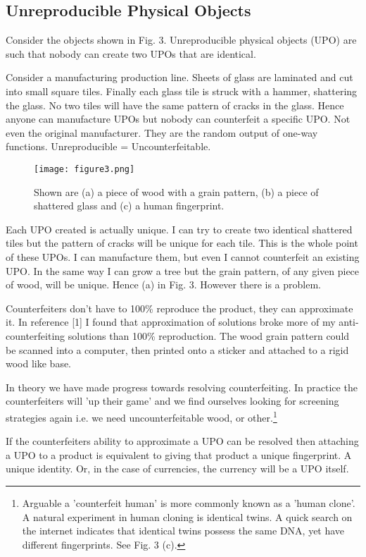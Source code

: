 \documentclass[smallextended]{svjour3}       	\smartqed  \usepackage{graphicx}
\begin{document}
\subsection{Unreproducible Physical Objects}
Consider the objects shown in Fig. 3. Unreproducible physical objects (UPO) are such that nobody can create two UPOs that are identical.

Consider a manufacturing production line. Sheets of glass are laminated and cut into small square tiles. Finally each glass tile is struck with a hammer, shattering the glass. No two tiles will have the same pattern of cracks in the glass. Hence anyone can manufacture UPOs but nobody can counterfeit a specific UPO. Not even the original manufacturer. They are the random output of one-way functions. Unreproducible = Uncounterfeitable.

\begin{figure}[!ht]
\centering
\texttt{[image: figure3.png]}
\caption{Shown are (a) a piece of wood with a grain pattern, (b) a piece of shattered glass and (c) a human fingerprint.}
\label{fig_sim}
\end{figure}

Each UPO created is actually unique. I can try to create two identical shattered tiles but the pattern of cracks will be unique for each tile. This is the whole point of these UPOs. I can manufacture them, but even I cannot counterfeit an existing UPO. In the same way I can grow a tree but the grain pattern, of any given piece of wood, will be unique. Hence (a) in Fig. 3. However there is a problem.

Counterfeiters don't have to 100\% reproduce the product, they can approximate it. In reference [1] I found that approximation of solutions broke more of my anti-counterfeiting solutions than 100\% reproduction. The wood grain pattern could be scanned into a computer, then printed onto a sticker and attached to a rigid wood like base.

In theory we have made progress towards resolving counterfeiting. In practice the counterfeiters will 'up their game' and we find ourselves looking for screening strategies again i.e. we need uncounterfeitable wood, or other.\footnote{Arguable a 'counterfeit human' is more commonly known as a 'human clone'. A natural experiment in human cloning is identical twins. A quick search on the internet indicates that identical twins possess the same DNA, yet have different fingerprints. See Fig. 3 (c).}

If the counterfeiters ability to approximate a UPO can be resolved then attaching a UPO to a product is equivalent to giving that product a unique fingerprint. A unique identity. Or, in the case of currencies, the currency will be a UPO itself.
\end{document}
